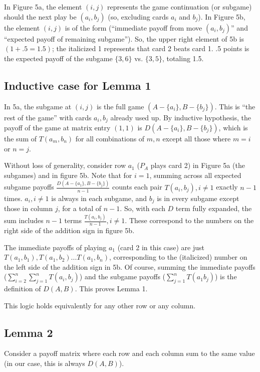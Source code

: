 \documentclass[11pt, oneside]{article} 	%
\begin{document}
In Figure 5a, the element $(i,j)$ represents the game continuation (or subgame) should the next play be $(a_i, b_j)$ (so, excluding cards $a_i$ and $b_j$). 
In Figure 5b, the element $(i,j)$ is of the form (``immediate payoff from move $(a_i, b_j)$'' and ``expected payoff of remaining subgame''). So, the upper right element of 5b is $(\mathit{1} + .5 = 1.5)$; the italicized 1 represents that card 2 beats card 1. .5 points is the expected payoff of the subgame $\{3,6\}$ vs. $\{3,5\}$, totaling 1.5. 

\subsection{Inductive case for Lemma 1}

In 5a, the subgame at $(i, j)$ is the full game $(A - \{a_i\}, B-\{b_j\})$. This is ``the rest of the game'' with cards $a_i, b_j$ already used up. By inductive hypothesis, the payoff of the game at matrix entry $(1,1)$ is $D(A-\{a_i\}, B-\{b_j\})$, which is the sum of $T(a_m, b_n)$ for all combinations of $m, n$ except all those where $m=i$ or $n=j$. 

Without loss of generality, consider row $a_1$ ($P_A$ plays card 2) in Figure 5a (the subgames) and in figure 5b. Note that for $i=1$, summing across all expected subgame payoffs $\frac{D(A-\{a_1\}, B-\{b_j\})}{n-1}$ counts each pair $T(a_i, b_j), i \neq 1$ exactly $n-1$ times. $a_i, i \neq 1$ is always in each subgame, and $b_j$ is in every subgame except those in column $j$, for a total of $n-1$. So, with each $D$ term fully expanded, the sum includes $n-1$ terms $\frac{T(a_i, b_j)}{n-1}, i \neq 1$. These correspond to the numbers on the right side of the addition sign in figure 5b.

The immediate payoffs of playing $a_1$ (card 2 in this case) are just $T(a_1, b_1), T(a_1, b_2)... T(a_1, b_n)$, corresponding to the (italicized) number on the left side of the addition sign in 5b. Of course, summing the immediate payoffs ($\sum_{i=2}^n\sum_{j=1}^n T(a_i, b_j)$) and the subgame payoffs ($\sum_{j=1}^n T(a_1 b_j)$) is the definition of $D(A,B)$. This proves Lemma 1.

This logic holds equivalently for any other row or any column.

\subsection{Lemma 2}

Consider a payoff matrix where each row and each column sum to the same value (in our case, this is always $D(A,B)$).
\end{document}
